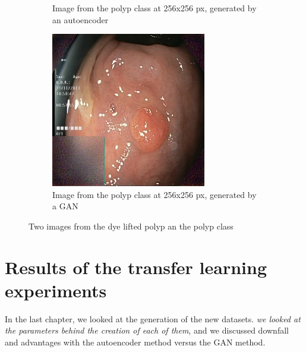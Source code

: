 \begin{figure}
\begin{subfigure}[t]{0.4\textwidth}
            \caption{Image from the polyp class at 256x256 px, generated by an autoencoder }    
            \label{fig:zAE}
        \end{subfigure}
        \qquad%
        \begin{subfigure}[t]{0.4\textwidth}   
            \centering 
            \includegraphics[width=\textwidth]{experiments/figures/both/greenGAN.jpg}
            \caption{Image from the polyp class at 256x256 px, generated by a GAN\\ }    
            \label{fig:zGAN}
        \end{subfigure}
        \caption{Two images from the dye lifted polyp an the polyp class} 
        \label{fig:GC1GREEN}
    \end{figure}
    

   
\FloatBarrier

\section{Results of the transfer learning experiments}
In the last chapter, we looked at the generation of the new datasets. \textit{we looked at the parameters behind the creation of each of them}, and we discussed downfall and advantages with the autoencoder method versus the GAN method. 

